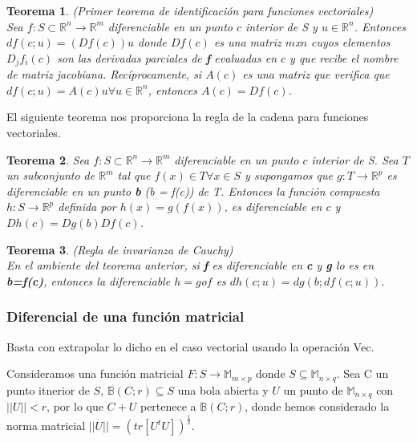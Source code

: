 \documentclass{article}
\theoremstyle{theorem-style}  %
\newtheorem{theorem}{Teorema}[section]  %
\theoremstyle{definition-style}
\theoremstyle{example-style}
\theoremstyle{exercise-style}
\begin{document}
\begin{theorem} (Primer teorema de identificación para funciones vectoriales)\\
	Sea $f: S\subset \mathbb{R}^n \rightarrow \mathbb{R}^m$ diferenciable en un punto $c$ interior de S y $u  \in \mathbb{R}^n$. Entonces $df(c;u)=(Df(c))u$ donde $Df(c)$ es una matriz $m$x$n$ cuyos elementos $D_jf_i(c)$ son las derivadas parciales de \textbf{f} evaluadas en $c$ y que recibe el nombre de matriz jacobiana. Recíprocamente, si $A(c)$ es una matriz que verifica que $df(c;u)=A(c)u \forall u\in \mathbb{R}^n$, entonces $A(c) = Df(c)$. 
\end{theorem}

El siguiente teorema nos proporciona la regla de la cadena para funciones vectoriales.

\begin{theorem}
	Sea $f: S\subset \mathbb{R}^n \rightarrow \mathbb{R}^m$ diferenciable en un punto $c$ interior de S. Sea $T$ un subconjunto de $\mathbb{R}^m$ tal que $f(x) \in T \forall x \in S$ y supongamos que $g: T \rightarrow \mathbb{R}^p$ es diferenciable en un punto \textbf{b} (b = f(c)) de T. Entonces la función compuesta $h: S \rightarrow \mathbb{R}^p$ definida por $h(x)=g(f(x))$, es diferenciable en $c$ y $Dh(c)=Dg(b)Df(c)$.
\end{theorem}

\begin{theorem} (Regla de invarianza de Cauchy) \\
	En el ambiente del teorema anterior, si \textbf{f} es diferenciable en \textbf{c} y \textbf{g} lo es en \textbf{b=f(c)}, entonces la diferenciable $h=g$o$f$ es $dh(c;u) = dg(b;df(c;u))$.   
	
\end{theorem}

\subsubsection{Diferencial de una función matricial}

Basta con extrapolar lo dicho en el caso vectorial usando la operación Vec.

Consideramos una función matricial $F: S \rightarrow \mathbb{M}_{m\times p}$ donde $S \subseteq \mathbb{M}_{n\times q}$. Sea C un punto itnerior de $S$, $\mathbb{B}(C;r) \subseteq S$ una bola abierta y $U$ un punto de $\mathbb{M}_{n\times q}$ con $||U||<r$, por lo que $C+U$ pertenece a $\mathbb{B}(C;r)$, donde hemos considerado la norma matricial $||U||=(tr[U^tU])^{\frac{1}{2}}$.
\end{document}
